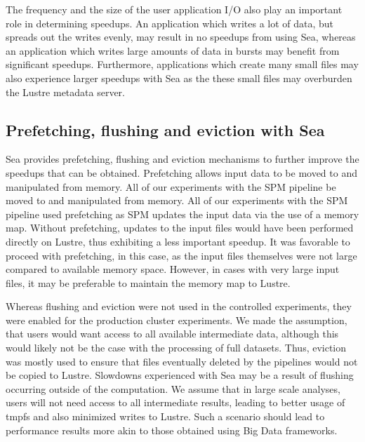 \documentclass[fleqn,10pt]{wlscirep}
\begin{document}
    The frequency and the size of the user application I/O also play an
    important role in determining speedups. An application which writes a lot of
    data, but spreads out the writes evenly, may result in no speedups from
    using Sea, whereas an application which writes large amounts of data in
    bursts may benefit from significant speedups. Furthermore, applications
    which create many small files may also experience larger speedups with Sea
    as the these small files may overburden the Lustre metadata server.

    
    \subsection{Prefetching, flushing and eviction with Sea}

    Sea provides prefetching, flushing and eviction mechanisms to further
    improve the speedups that can be obtained. Prefetching allows input data to
    be moved to and manipulated from memory. All of our experiments with the SPM pipeline
    be moved to and manipulated from memory. All of our experiments with the SPM pipeline
    used prefetching as SPM updates the input data via the use of a memory map.
    Without prefetching, updates to the input files would have been performed
    directly on Lustre, thus exhibiting a less important speedup. It was
    favorable to proceed with prefetching, in this case, as the input files
    themselves were not large compared to available memory space. However, in
    cases with very large input files, it may be preferable to maintain the
    memory map to Lustre.

    Whereas flushing and eviction were not used in the controlled experiments,
    they were enabled for the production cluster experiments. We made the assumption, that
    users would want access to all available intermediate data, although this
    would likely not be the case with the processing of full datasets. Thus,
    eviction was mostly used to ensure that files eventually deleted by the
    pipelines would not be copied to Lustre. Slowdowns experienced with Sea may
    be a result of flushing occurring outside of the computation. We assume that
    in large scale analyses, users will not need access to all intermediate
    results, leading to better usage of tmpfs and also minimized writes to
    Lustre. Such a scenario should lead to performance results more akin to
    those obtained using Big Data frameworks.
\end{document}
